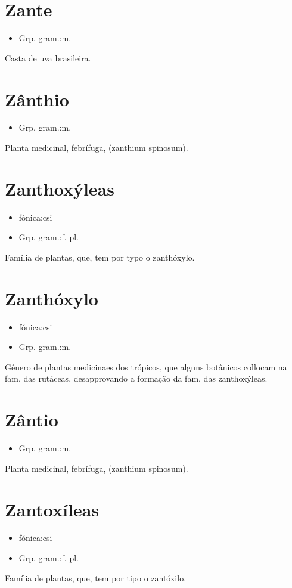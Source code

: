 \section{Zante}
\begin{itemize}
\item {Grp. gram.:m.}
\end{itemize}
Casta de uva brasileira.
\section{Zânthio}
\begin{itemize}
\item {Grp. gram.:m.}
\end{itemize}
Planta medicinal, febrífuga, (\textunderscore zanthium spinosum\textunderscore ).
\section{Zanthoxýleas}
\begin{itemize}
\item {fónica:csi}
\end{itemize}
\begin{itemize}
\item {Grp. gram.:f. pl.}
\end{itemize}
Família de plantas, que, tem por typo o zanthóxylo.
\section{Zanthóxylo}
\begin{itemize}
\item {fónica:csi}
\end{itemize}
\begin{itemize}
\item {Grp. gram.:m.}
\end{itemize}
Gênero de plantas medicinaes dos trópicos, que alguns botânicos collocam na fam. das rutáceas, desapprovando a formação da fam. das zanthoxýleas.
\section{Zântio}
\begin{itemize}
\item {Grp. gram.:m.}
\end{itemize}
Planta medicinal, febrífuga, (\textunderscore zanthium spinosum\textunderscore ).
\section{Zantoxíleas}
\begin{itemize}
\item {fónica:csi}
\end{itemize}
\begin{itemize}
\item {Grp. gram.:f. pl.}
\end{itemize}
Família de plantas, que, tem por tipo o zantóxilo.
